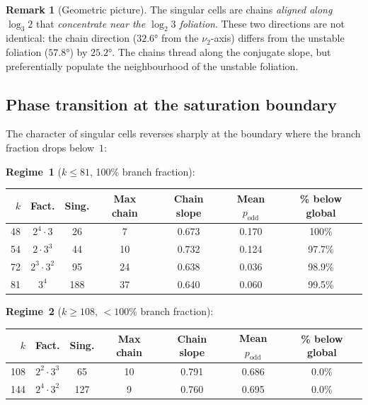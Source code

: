 \documentclass[11pt,a4paper]{article}
\theoremstyle{plain}
\theoremstyle{definition}
\newtheorem{remark}[theorem]{Remark}
\begin{document}
\begin{remark}[Geometric picture]
    The singular cells are chains \emph{aligned along $\log_3 2$}
    that \emph{concentrate near the $\log_2 3$ foliation}.  These
    two directions are not identical: the chain direction ($32.6°$
    from the $\nu_2$-axis) differs from the unstable foliation
    ($57.8°$) by $25.2°$.  The chains thread along the conjugate
    slope, but preferentially populate the neighbourhood of the
    unstable foliation.
\end{remark}


\subsection{Phase transition at the saturation boundary}

\begin{empirical}\label{obs:two-regimes}
    The character of singular cells reverses sharply at the boundary
    where the branch fraction drops below~$1$:

    \medskip
    \noindent\textbf{Regime~1} ($k \leq 81$, 100\% branch fraction):
    \begin{center}
    \renewcommand{\arraystretch}{1.15}
    \begin{tabular}{rcccccc}
        \toprule
        $k$ & Fact. & Sing. & Max chain & Chain slope & Mean $p_{\mathrm{odd}}$ & \% below global \\
        \midrule
        48 & $2^4 \cdot 3$ & 26 & 7 & 0.673 & 0.170 & 100\% \\
        54 & $2 \cdot 3^3$ & 44 & 10 & 0.732 & 0.124 & 97.7\% \\
        72 & $2^3 \cdot 3^2$ & 95 & 24 & 0.638 & 0.036 & 98.9\% \\
        81 & $3^4$ & 188 & 37 & 0.640 & 0.060 & 99.5\% \\
        \bottomrule
    \end{tabular}
    \end{center}

    \noindent\textbf{Regime~2} ($k \geq 108$, $<100$\% branch fraction):
    \begin{center}
    \renewcommand{\arraystretch}{1.15}
    \begin{tabular}{rcccccc}
        \toprule
        $k$ & Fact. & Sing. & Max chain & Chain slope & Mean $p_{\mathrm{odd}}$ & \% below global \\
        \midrule
        108 & $2^2 \cdot 3^3$ & 65 & 10 & 0.791 & 0.686 & 0.0\% \\
        144 & $2^4 \cdot 3^2$ & 127 & 9 & 0.760 & 0.695 & 0.0\% \\
        \bottomrule
    \end{tabular}
    \end{center}
\end{empirical}
\end{document}
